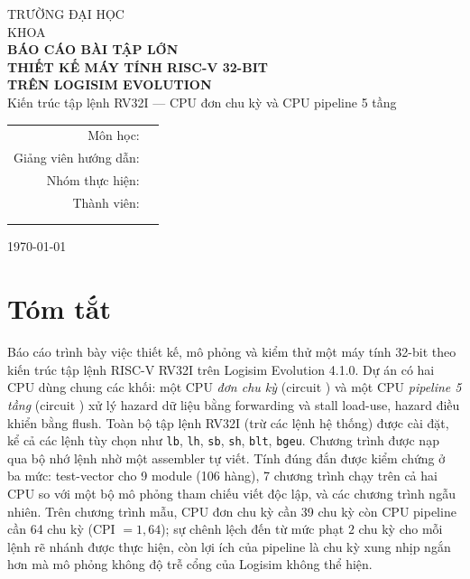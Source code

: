 \documentclass[11pt,a4paper]{article}
\newcommand{\sig}[1]{\texttt{\detokenize{#1}}}
\begin{document}
\begin{titlepage}
\centering
{\large TRƯỜNG ĐẠI HỌC \underline{\hspace{6cm}}}\\[2pt]
{\large KHOA \underline{\hspace{6cm}}}\\[2.2cm]
{\Large \textbf{BÁO CÁO BÀI TẬP LỚN}}\\[0.6cm]
{\huge \textbf{THIẾT KẾ MÁY TÍNH RISC-V 32-BIT\\[4pt] TRÊN LOGISIM EVOLUTION}}\\[0.8cm]
{\large Kiến trúc tập lệnh RV32I --- CPU đơn chu kỳ và CPU pipeline 5 tầng}\\[2.5cm]
\begin{tabular}{rl}
Môn học: & \underline{\hspace{7cm}}\\[6pt]
Giảng viên hướng dẫn: & \underline{\hspace{7cm}}\\[6pt]
Nhóm thực hiện: & \underline{\hspace{7cm}}\\[6pt]
Thành viên: & \underline{\hspace{7cm}}\\[6pt]
 & \underline{\hspace{7cm}}\\[6pt]
 & \underline{\hspace{7cm}}\\
\end{tabular}
\vfill
{\large \today}
\end{titlepage}

\section*{Tóm tắt}
Báo cáo trình bày việc thiết kế, mô phỏng và kiểm thử một máy tính 32-bit theo kiến trúc tập lệnh RISC-V RV32I trên Logisim Evolution 4.1.0.
Dự án có hai CPU dùng chung các khối: một CPU \emph{đơn chu kỳ} (circuit \sig{main}) và một CPU \emph{pipeline 5 tầng} (circuit \sig{Pipeline}) xử lý
hazard dữ liệu bằng forwarding và stall load-use, hazard điều khiển bằng flush. Toàn bộ tập lệnh RV32I (trừ các lệnh hệ thống) được cài đặt, kể cả các lệnh
tùy chọn như \texttt{lb}, \texttt{lh}, \texttt{sb}, \texttt{sh}, \texttt{blt}, \texttt{bgeu}. Chương trình được nạp qua bộ nhớ lệnh nhờ một assembler tự viết.
Tính đúng đắn được kiểm chứng ở ba mức: test-vector cho 9 module (106 hàng), 7 chương trình chạy trên cả hai CPU so với một bộ mô phỏng tham chiếu viết độc lập,
và các chương trình ngẫu nhiên. Trên chương trình mẫu, CPU đơn chu kỳ cần 39 chu kỳ còn CPU pipeline cần 64 chu kỳ (CPI $=1{,}64$); sự chênh lệch đến từ mức phạt $2$ chu kỳ
cho mỗi lệnh rẽ nhánh được thực hiện, còn lợi ích của pipeline là chu kỳ xung nhịp ngắn hơn mà mô phỏng không độ trễ cổng của Logisim không thể hiện.
\end{document}
